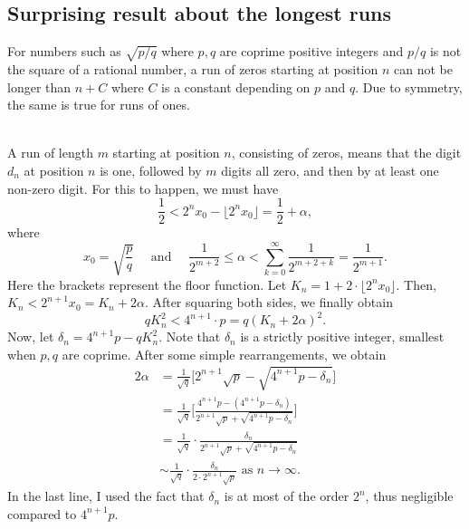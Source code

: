 \documentclass[oneside,10pt]{book}
\newenvironment{proof}[1][Proof]{\begin{trivlist}
\item[\hskip \labelsep {\bfseries #1}]}{\end{trivlist}}
\begin{document}
\subsection{Surprising result about the longest runs}\label{nntserde}

For numbers such as $\sqrt{p/q}$ where $p,q$ are coprime positive integers and $p/q$ is not the square of a rational number, a run of zeros starting at position $n$ can not be longer than $n + C$ where $C$ is a constant depending on $p$ and $q$. Due to symmetry, the same is true for runs of ones. 

\begin{proof} 
\, \\
A run of length $m$ starting at position $n$, consisting of zeros, means that the digit $d_{n}$ at position $n$ is one, followed by $m$ digits all zero, and then by 
 at least one non-zero digit. For this to happen, we must have
$$
\frac{1}{2} < 2^n x_0 - \Big\lfloor 2^n x_0 \Big\rfloor = \frac{1}{2} +\alpha,
$$ 
where
$$ x_0 = \sqrt{\frac{p}{q}} \quad \text{ and } \quad \frac{1}{2^{m+2}}\leq \alpha < \sum_{k=0}^\infty \frac{1}{2^{m+2+k}} = \frac{1}{2^{m+1}}.
$$
Here the brackets represent the floor function. Let $K_n = 1 + 2 \cdot \lfloor 2^n x_0 \rfloor $. Then, 
$K_n < 2^{n+1} x_0 = K_n +2\alpha$. After squaring both sides, we finally obtain
$$
qK_n^2 < 4^{n+1}\cdot p = q (K_n + 2\alpha)^2.
$$
Now, let $\delta_n = 4^{n+1}p - qK_n^2$. Note that $\delta_n$ is a strictly positive integer, smallest when $p,q$ are coprime. After some simple rearrangements, we
 obtain
\begin{align}
2\alpha & = \frac{1}{\sqrt{q}}\bigg[2^{n+1}\sqrt{p} -\sqrt{4^{n+1}p - \delta_n}\bigg] \nonumber \\
  & = \frac{1}{\sqrt{q}}
\Bigg[\frac{4^{n+1}p - (4^{n+1}p-\delta_n)}{2^{n+1}\sqrt{p} + \sqrt{4^{n+1}p -\delta_n}}\Bigg] \nonumber \\
  & = \frac{1}{\sqrt{q}} \cdot \frac{\delta_n}{2^{n+1}\sqrt{p} + \sqrt{4^{n+1}p - \delta_n}} \nonumber \\
  & \sim \frac{1}{\sqrt{q}}\cdot \frac{\delta_n}{2\cdot 2^{n+1}\sqrt{p}} \text{ as } n\rightarrow\infty. \nonumber
\end{align}
In the last line, I used the fact that $\delta_n$ is at most of the order $2^n$, thus negligible compared to $4^{n+1}p$. 


\end{proof}
\end{document}
